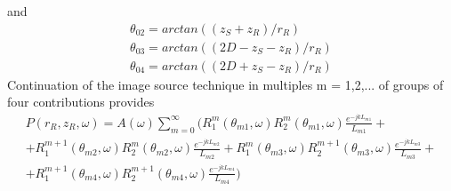 \noindent and
\begin{equation}
\begin{gathered} 
\theta_{02}  = arctan((z_{S} + z_{R}) / r_{R}) \\
\theta_{03}  = arctan((2D - z_{S} - z_{R}) / r_{R}) \\
\theta_{04}  = arctan((2D + z_{S} - z_{R}) / r_{R})
\end{gathered} 
\end{equation}
\noindent Continuation of the image source technique in multiples m = 1,2,... of groups of four contributions provides
\begin{equation}
\begin{gathered} 
\textit{$P(r_R, z_R,\omega)$} = A(\omega)\sum_{m=0}^{\infty} \Bigg( R_{1}^{m}(\theta_{m1},\omega)  R_{2}^{m}(\theta_{m1},\omega)  \frac{e^{-jkL_{m1}}}{L_{m1}} + \\
 + R_{1}^{m+1}(\theta_{m2},\omega)  R_{2}^{m}(\theta_{m2},\omega)  \frac{e^{-jkL_{m2}}}{L_{m2}} +  R_{1}^{m}(\theta_{m3},\omega)  R_{2}^{m+1}(\theta_{m3},\omega)  \frac{e^{-jkL_{m3}}}{L_{m3}} + \\
 +  R_{1}^{m+1}(\theta_{m4},\omega)  R_{2}^{m+1}(\theta_{m4},\omega)  \frac{e^{-jkL_{m4}}}{L_{m4}} \Bigg)
\end{gathered}
\end{equation}






